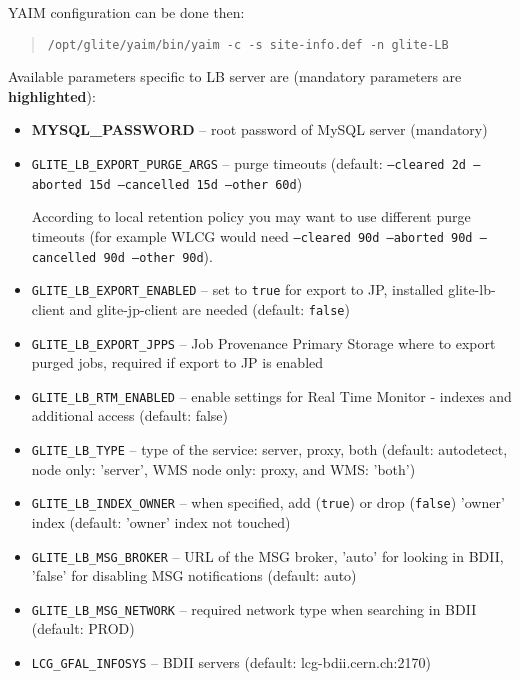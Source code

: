 YAIM configuration can be done then:

\begin{quote}
\texttt{/opt/glite/yaim/bin/yaim -c -s site-info.def -n glite-LB}
\end{quote}

Available parameters specific to LB server are (mandatory parameters are \textbf{highlighted}):

\begin{itemize}
\item \textbf{MYSQL\_PASSWORD} -- root password of MySQL server (mandatory)
\item \texttt{GLITE\_LB\_EXPORT\_PURGE\_ARGS} -- purge timeouts (default: \texttt{--cleared 2d --aborted 15d --cancelled 15d --other 60d})

According to local retention policy you may want to use different purge timeouts (for example WLCG would need \texttt{--cleared 90d --aborted 90d --cancelled 90d --other 90d}).
\item \texttt{GLITE\_LB\_EXPORT\_ENABLED} -- set to \texttt{true} for export to JP, installed glite-lb-client and glite-jp-client are needed (default: \texttt{false})
\item \texttt{GLITE\_LB\_EXPORT\_JPPS} -- Job Provenance Primary Storage where to export purged jobs, required if export to JP is enabled
\item \texttt{GLITE\_LB\_RTM\_ENABLED} -- enable settings for Real Time Monitor - indexes and additional access (default: false)
\item \texttt{GLITE\_LB\_TYPE} -- type of the \LB service: server, proxy, both (default: autodetect, \LB node only: 'server', WMS node only: proxy, \LB and WMS: 'both')
\item \texttt{GLITE\_LB\_INDEX\_OWNER} -- when specified, add (\texttt{true}) or drop (\texttt{false}) 'owner' index (default: 'owner' index not touched)
\item \texttt{GLITE\_LB\_MSG\_BROKER} -- URL of the MSG broker, 'auto' for looking in BDII, 'false' for disabling MSG notifications (default: auto)
\item \texttt{GLITE\_LB\_MSG\_NETWORK} -- required network type when searching in BDII (default: PROD)
\item \texttt{LCG\_GFAL\_INFOSYS} -- BDII servers (default: lcg-bdii.cern.ch:2170)
\end{itemize}

